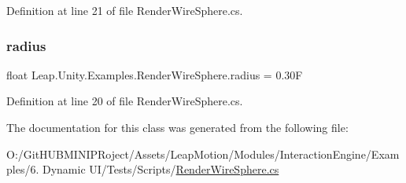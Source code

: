 Definition at line 21 of file Render\+Wire\+Sphere.\+cs.

\mbox{\label{class_leap_1_1_unity_1_1_examples_1_1_render_wire_sphere_a47a851eb3662e260db097c3da1e5b7e7}} 
\subsubsection{\texorpdfstring{radius}{radius}}
{\footnotesize\ttfamily float Leap.\+Unity.\+Examples.\+Render\+Wire\+Sphere.\+radius = 0.\+30F}



Definition at line 20 of file Render\+Wire\+Sphere.\+cs.



The documentation for this class was generated from the following file\+:\begin{DoxyCompactItemize}
\item 
O\+:/\+Git\+H\+U\+B\+M\+I\+N\+I\+P\+Roject/\+Assets/\+Leap\+Motion/\+Modules/\+Interaction\+Engine/\+Examples/6. Dynamic U\+I/\+Tests/\+Scripts/\mbox{\hyperlink{_render_wire_sphere_8cs}{Render\+Wire\+Sphere.\+cs}}\end{DoxyCompactItemize}
